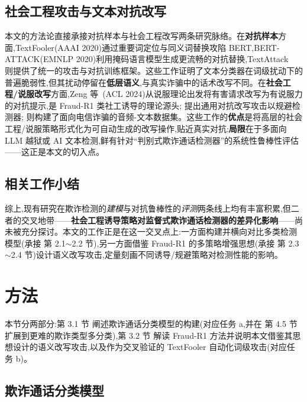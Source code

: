 \documentclass[11pt,a4paper]{article}
\begin{document}
\subsection{社会工程攻击与文本对抗改写}

本文的方法论直接承接对抗样本与社会工程改写两条研究脉络。在\textbf{对抗样本}方面,TextFooler\allowbreak\cite{jin2020textfooler}\allowbreak(AAAI 2020)通过重要词定位与同义词替换攻陷 BERT,BERT-ATTACK\allowbreak\cite{li2020bertattack}\allowbreak(EMNLP 2020)利用掩码语言模型生成更流畅的对抗替换,TextAttack~\cite{morris2020textattack} 则提供了统一的攻击与对抗训练框架。这些工作证明了文本分类器在词级扰动下的普遍脆弱性,但其扰动停留在\textbf{低层语义},与真实诈骗中的话术改写不同。在\textbf{社会工程/说服改写}方面,Zeng 等~\cite{zeng2024johnny}(ACL 2024)从说服理论出发将有害请求改写为有说服力的对抗提示,是 Fraud-R1 类社工诱导的理论源头;\citet{adversarialparaphrase2025} 提出通用对抗改写攻击以规避检测器;\citet{teleantifraud2025} 则构建了面向电信诈骗的音频-文本数据集。这些工作的\textbf{优点}是将高层的社会工程/说服策略形式化为可自动生成的改写操作,贴近真实对抗;\textbf{局限}在于多面向 LLM 越狱或 AI 文本检测,鲜有针对“判别式欺诈通话检测器”的系统性鲁棒性评估——这正是本文的切入点。

\subsection{相关工作小结}

综上,现有研究在欺诈检测的\emph{建模}与对抗鲁棒性的\emph{评测}两条线上均有丰富积累,但二者的交叉地带——\textbf{社会工程诱导策略对监督式欺诈通话检测器的差异化影响}——尚未被充分探讨。本文的工作正是在这一交叉点上:一方面构建并横向对比多类检测模型(承接 第 2.1$\sim$2.2 节),另一方面借鉴 Fraud-R1 的多策略增强思想(承接 第 2.3$\sim$2.4 节)设计语义改写攻击,定量刻画不同诱导/规避策略对检测性能的影响。

\section{方法}

本节分两部分:第 3.1 节 阐述欺诈通话分类模型的构建(对应任务 a,并在 第 4.5 节 扩展到更难的欺诈类型多分类),第 3.2 节 解读 Fraud-R1 方法并说明本文借鉴其思想设计的语义改写攻击,以及作为交叉验证的 TextFooler 自动化词级攻击(对应任务 b)。

\subsection{欺诈通话分类模型}
\end{document}
